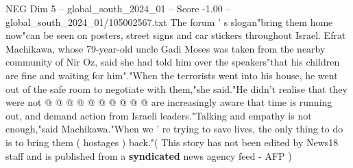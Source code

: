 \begin{textsample}{NEG Dim 5 – global\_south\_2024\_01 – Score -1.00 – global\_south\_2024\_01/105002567.txt}
The forum ' s slogan"bring them home now"can be seen on posters, street signs and car stickers throughout Israel.
Efrat Machikawa, whose 79-year-old uncle Gadi Moses was taken from the nearby community of Nir Oz, said she had told him over the speakers"that his children are fine and waiting for him"."When the terrorists went into his house, he went out of the safe room to negotiate with them,"she said."He didn't realise that they were not @ @ @ @ @ @ @ @ @ @ are increasingly aware that time is running out, and demand action from Israeli leaders."Talking and empathy is not enough,"said Machikawa."When we ' re trying to save lives, the only thing to do is to bring them ( hostages ) back."( This story has not been edited by News18 staff and is published from a \textbf{syndicated} news agency feed - AFP )

\end{textsample}
